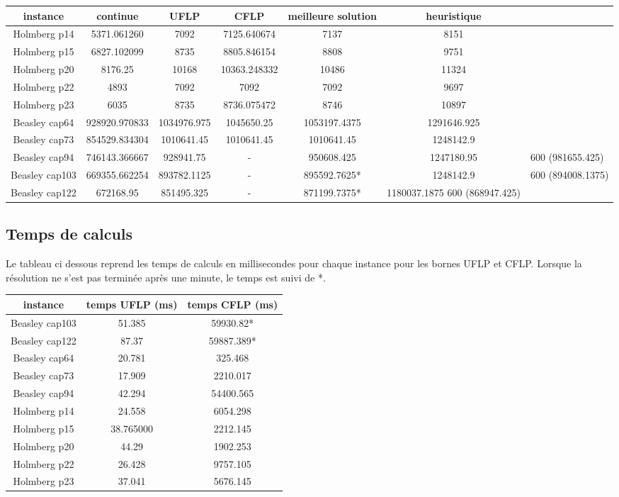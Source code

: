 \begin{tabular}{|c|c|c|c|c|c|}
    \hline
    instance & continue & UFLP & CFLP & meilleure solution & heuristique \\
    \hline
    Holmberg p14 & 5371.061260 & 7092 & 7125.640674 & 7137 & 8151 \\
    Holmberg p15 & 6827.102099 & 8735 & 8805.846154 & 8808 & 9751 \\
    Holmberg p20 & 8176.25 & 10168 & 10363.248332 & 10486 & 11324 \\
    Holmberg p22 & 4893 & 7092 & 7092 & 7092 & 9697 \\
    Holmberg p23 & 6035 & 8735 & 8736.075472 & 8746 & 10897 \\
    Beasley cap64 & 928920.970833 & 1034976.975 & 1045650.25 & 1053197.4375 & 1291646.925 \\
    Beasley cap73 & 854529.834304 & 1010641.45 & 1010641.45 & 1010641.45 & 1248142.9 \\
	Beasley cap94 & 746143.366667 & 928941.75 & - & 950608.425 & 1247180.95 & 600 (981655.425) \\
    Beasley cap103 & 669355.662254 & 893782.1125 & - & 895592.7625* & 1248142.9 & 600 (894008.1375) \\
    Beasley cap122 & 672168.95 & 851495.325 & - & 871199.7375* & 1180037.1875 600 (868947.425) \\
    \hline
\end{tabular}

\newpage

\subsection{Temps de calculs}

Le tableau ci dessous reprend les temps de calculs en millisecondes pour chaque instance pour les bornes UFLP et CFLP.
Lorsque la résolution ne s'est pas terminée après une minute, le temps est suivi de *. \newline

\begin{tabular}{|c|c|c|}
    \hline
    instance & temps UFLP (ms) & temps CFLP (ms) \\
    \hline
    Beasley cap103 & 51.385 & 59930.82* \\
    Beasley cap122 & 87.37 & 59887.389* \\
    Beasley cap64 & 20.781 & 325.468 \\
    Beasley cap73 & 17.909 & 2210.017 \\
    Beasley cap94 & 42.294 & 54400.565 \\
    Holmberg p14 & 24.558 & 6054.298 \\
    Holmberg p15 & 38.765000 & 2212.145 \\
    Holmberg p20 & 44.29 & 1902.253 \\
    Holmberg p22 & 26.428 & 9757.105 \\
    Holmberg p23 &  37.041 & 5676.145 \\
    \hline
\end{tabular}

